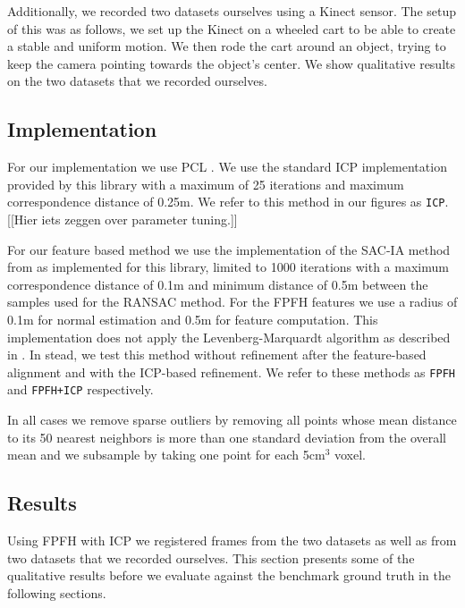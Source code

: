 \documentclass[a4paper]{article}
\begin{document}
Additionally, we recorded two datasets ourselves using a Kinect sensor. The setup of this was as follows, we set up the Kinect on a wheeled cart to be able to create a stable and uniform motion. We then rode the cart around an object, trying to keep the camera pointing towards the object's center. We show qualitative results on the two datasets that we recorded ourselves.

\subsection{Implementation}

For our implementation we use \ac{PCL} \cite{Rusu_ICRA2011_PCL}. We use the standard \ac{ICP} implementation provided by this library with a maximum of 25 iterations and maximum correspondence distance of 0.25m. We refer to this method in our figures as \texttt{ICP}. [[Hier iets zeggen over parameter tuning.]]

 For our feature based method we use the implementation of the \ac{SAC-IA} method from \cite{rusu2009fast} as implemented for this library, limited to 1000 iterations with a maximum correspondence distance of 0.1m and minimum distance of 0.5m between the samples used for the \ac{RANSAC} method. For the \ac{FPFH} features we use a radius of 0.1m for normal estimation and 0.5m for feature computation. This implementation does not apply the Levenberg-Marquardt algorithm as described in \cite{rusu2009fast}. In stead, we test this method without refinement after the feature-based alignment and with the ICP-based refinement. We refer to these methods as \texttt{FPFH} and \texttt{FPFH+ICP} respectively.
 
In all cases we remove sparse outliers by removing all points whose mean distance to its 50 nearest neighbors is more than one standard deviation from the overall mean and we subsample by taking one point for each 5cm$^3$ voxel.



\subsection{Results}

Using \ac{FPFH} with \ac{ICP} we registered frames from the two datasets as well as from two datasets that we recorded ourselves. This section presents some of the qualitative results before we evaluate against the benchmark ground truth in the following sections.
\end{document}
